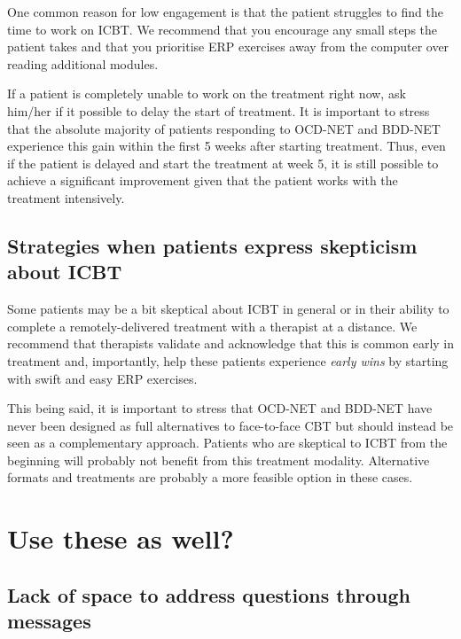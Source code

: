\documentclass[]{book}
\theoremstyle{definition}
\theoremstyle{definition}
\theoremstyle{definition}
\theoremstyle{remark}
\begin{document}
One common reason for low engagement is that the patient struggles to
find the time to work on ICBT. We recommend that you encourage any small
steps the patient takes and that you prioritise ERP exercises away from
the computer over reading additional modules.

If a patient is completely unable to work on the treatment right now,
ask him/her if it possible to delay the start of treatment. It is
important to stress that the absolute majority of patients responding to
OCD-NET and BDD-NET experience this gain within the first 5 weeks after
starting treatment. Thus, even if the patient is delayed and start the
treatment at week 5, it is still possible to achieve a significant
improvement given that the patient works with the treatment intensively.

\hypertarget{strategies-when-patients-express-skepticism-about-icbt}{%
\subsection{Strategies when patients express skepticism about
ICBT}\label{strategies-when-patients-express-skepticism-about-icbt}}

Some patients may be a bit skeptical about ICBT in general or in their
ability to complete a remotely-delivered treatment with a therapist at a
distance. We recommend that therapists validate and acknowledge that
this is common early in treatment and, importantly, help these patients
experience \emph{early wins} by starting with swift and easy ERP
exercises.

This being said, it is important to stress that OCD-NET and BDD-NET have
never been designed as full alternatives to face-to-face CBT but should
instead be seen as a complementary approach. Patients who are skeptical
to ICBT from the beginning will probably not benefit from this treatment
modality. Alternative formats and treatments are probably a more
feasible option in these cases.

\hypertarget{use-these-as-well}{%
\section{Use these as well?}\label{use-these-as-well}}

\hypertarget{lack-of-space-to-address-questions-through-messages}{%
\subsection{Lack of space to address questions through
messages}\label{lack-of-space-to-address-questions-through-messages}}
\end{document}
